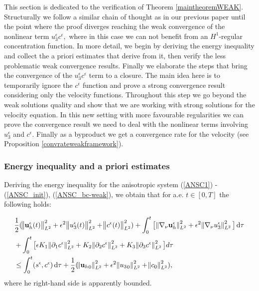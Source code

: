 \documentclass[11pt, a4paper]{article}
\newcommand*\diff{\mathop{}\!\mathrm{d}}
\begin{document}
This section is dedicated to the verification of Theorem \ref{maintheoremWEAK}. Structurally we follow a similar chain of thought as in our previous paper until the point where the proof diverges reaching the weak convergence of the nonlinear term $u_3^\epsilon c^\epsilon,$ where in this case we can not benefit from an $H^1$-regular concentration function. In more detail, we begin by deriving the energy inequality and collect the a priori estimates that derive from it, then verify the less problematic weak convergence results. Finally we elaborate the steps that bring the convergence of the $u_3^\epsilon c^\epsilon$ term to a closure. The main idea here is to temporarily ignore the $c^\epsilon$ function and prove a strong convergence result considering only the velocity functions. Throughout this step we go beyond the weak solutions quality and show that we are working with strong solutions for the velocity equation. In this new setting with more favourable regularities we can prove the convergence result we need to deal with the nonlinear terms involving $u_3^\epsilon$ and  $c^\epsilon$. Finally as a byproduct we get a convergence rate for the velocity (see Proposition \ref{convrateweakframework}).

\subsubsection{Energy inequality and a priori estimates}

Deriving the energy inequality for the anisotropic system (\ref{ANSC1}) - (\ref{ANSC_init}), (\ref{ANSC_bc-weak}), we obtain that for a.e. $t \in [0,T]$ the following holds:

\begin{equation}
\begin{split}
& \frac{1}{2} (\norm{\mathbf{u}_h^\epsilon (t)}_{L^2}^2 + \epsilon ^ 2 \norm{u_3^\epsilon (t)}_{L^2}^2 + \norm{c^\epsilon (t)}_{L^2}^2) + \int_0 ^ t \big[ \norm{\nabla_\nu \mathbf{u}_h^\epsilon}_{L^2}^2 + \epsilon ^ 2 \norm{\nabla_\nu u_3^\epsilon}_{L^2}^2 \big] \diff \tau \\
& + \int_0 ^ t \big [ \epsilon K_1 \norm{\partial_1 c^\epsilon}_{L^2}^2 + K_2 \norm{\partial_2 c^\epsilon}_{L^2}^2 + K_3 \norm{\partial_3 c^\epsilon}_{L^2}^2 \big ] d \tau \\
& \leq \int_0^t (s^\epsilon,c^\epsilon) \diff \tau + \frac{1}{2} (\norm{{\mathbf{u}_h}_0}_{L^2}^2 + \epsilon ^ 2 \norm{{u_3}_0}_{L^2}^2 + \norm{c_0}_{L^2}^2), \raisetag{50pt} \label{finalformEIEQ}
\end{split}
\end{equation}
where he right-hand side  is apparently bounded.
\end{document}
